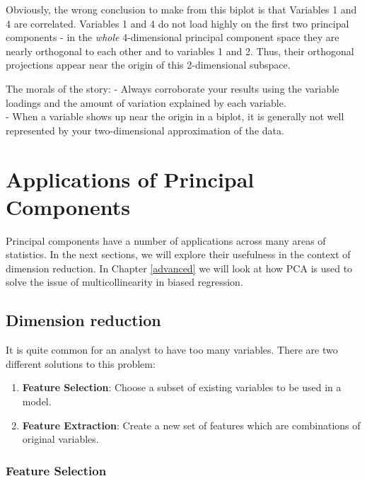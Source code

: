 \documentclass[
]{article}
\providecommand{\tightlist}{%
  \setlength{\itemsep}{0pt}\setlength{\parskip}{0pt}}
\theoremstyle{definition}
\theoremstyle{definition}
\theoremstyle{definition}
\theoremstyle{definition}
\theoremstyle{remark}
\begin{document}
Obviously, the wrong conclusion to make from this biplot is that Variables 1 and 4 are correlated. Variables 1 and 4 do not load highly on the first two principal components - in the \emph{whole} 4-dimensional principal component space they are nearly orthogonal to each other and to variables 1 and 2. Thus, their orthogonal projections appear near the origin of this 2-dimensional subspace.

The morals of the story:
- Always corroborate your results using the variable loadings and the amount of variation explained by each variable.\\
- When a variable shows up near the origin in a biplot, it is generally not well represented by your two-dimensional approximation of the data.

\hypertarget{pcaapp}{%
\section{Applications of Principal Components}\label{pcaapp}}

Principal components have a number of applications across many areas of statistics. In the next sections, we will explore their usefulness in the context of dimension reduction. In Chapter \ref{advanced} we will look at how PCA is used to solve the issue of multicollinearity in biased regression.

\hypertarget{dimension-reduction}{%
\subsection{Dimension reduction}\label{dimension-reduction}}

It is quite common for an analyst to have too many variables. There are two different solutions to this problem:

\begin{enumerate}
\def\labelenumi{\arabic{enumi}.}
\tightlist
\item
  \textbf{Feature Selection}: Choose a subset of existing variables to be used in a model.
\item
  \textbf{Feature Extraction}: Create a new set of features which are combinations of original variables.
\end{enumerate}

\hypertarget{feature-selection}{%
\subsubsection{Feature Selection}\label{feature-selection}}
\end{document}
